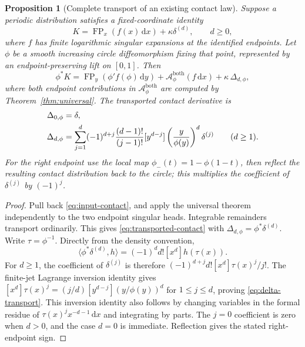 \documentclass[11pt]{article}
\newtheorem{proposition}[theorem]{Proposition}
\theoremstyle{definition}\newtheorem{definition}[theorem]{Definition}
\theoremstyle{remark}\newtheorem{remark}[theorem]{Remark}
\DeclareMathOperator{\FP}{FP}
\newcommand{\dd}{\,\mathrm d}
\newcommand{\Ac}{\mathcal A}
\begin{document}
\begin{proposition}[Complete transport of an existing contact law]\label{prop:collision-transport}
Suppose a periodic distribution satisfies a fixed-coordinate identity
\begin{equation}\label{eq:input-contact}
K=\FP_x(f(x)\dd x)+\kappa\delta^{(d)},\qquad d\ge0,
\end{equation}
where $f$ has finite logarithmic singular expansions at the identified endpoints. Let $\phi$ be a smooth increasing circle diffeomorphism fixing that point, represented by an endpoint-preserving lift on $[0,1]$. Then
\begin{equation}\label{eq:transported-contact}
\phi^*K=\FP_y(\phi'f(\phi)\dd y)
+\Ac_\phi^{\mathrm{both}}(f\dd x)+\kappa\,\Delta_{d,\phi},
\end{equation}
where both endpoint contributions in $\Ac_\phi^{\mathrm{both}}$ are computed by Theorem~\ref{thm:universal}. The transported contact derivative is
\begin{align}\label{eq:delta-transport}
\Delta_{0,\phi}&=\delta,\\
\Delta_{d,\phi}
&=\sum_{j=1}^{d}(-1)^{d+j}\frac{(d-1)!}{(j-1)!}
[y^{d-j}]\left(\frac y{\phi(y)}\right)^d\delta^{(j)}
\qquad(d\ge1).\notag
\end{align}
For the right endpoint use the local map
$\phi_-(t)=1-\phi(1-t)$, then reflect the resulting contact distribution back to the circle; this multiplies the coefficient of $\delta^{(j)}$ by $(-1)^j$.
\end{proposition}
\begin{proof}
Pull back \eqref{eq:input-contact}, and apply the universal theorem independently to the two endpoint singular heads. Integrable remainders transport ordinarily. This gives \eqref{eq:transported-contact} with $\Delta_{d,\phi}=\phi^*\delta^{(d)}$.
Write $\tau=\phi^{-1}$. Directly from the density convention,
\[
\langle\phi^*\delta^{(d)},h\rangle
=(-1)^dd![x^d]h(\tau(x)).
\]
For $d\ge1$, the coefficient of $\delta^{(j)}$ is therefore
$(-1)^{d+j}d![x^d]\tau(x)^j/j!$.
The finite-jet Lagrange inversion identity gives
$[x^d]\tau(x)^j=(j/d)[y^{d-j}](y/\phi(y))^d$ for $1\le j\le d$, proving \eqref{eq:delta-transport}. This inversion identity also follows by changing variables in the formal residue of $\tau(x)^j x^{-d-1}\dd x$ and integrating by parts. The $j=0$ coefficient is zero when $d>0$, and the case $d=0$ is immediate. Reflection gives the stated right-endpoint sign.
\end{proof}
\end{document}
